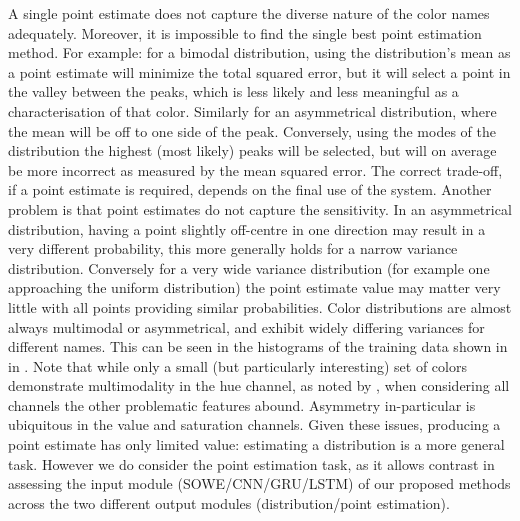 A single point estimate does not capture the diverse nature of the color names adequately. Moreover, it is impossible to find the single best point estimation method.
For example: for a bimodal distribution, using the distribution's mean as a point estimate will minimize the total squared error,  but it will select a point in the valley between the peaks, which is less likely and less meaningful as a characterisation of that color.
Similarly for an asymmetrical distribution, where the mean will be off to one side of the peak.
Conversely, using the modes of the distribution the highest (most likely) peaks will be selected, but will on average be more incorrect as measured by the mean squared error.
The correct trade-off, if a point estimate is required, depends on the final use of the system.
Another problem is that point estimates do not capture the sensitivity.
In an asymmetrical distribution, having a point slightly off-centre in one direction may result in a very different probability,
this more generally holds for a narrow variance distribution.
Conversely for a very wide variance distribution (for example one approaching the uniform distribution) the point estimate value may matter very little with all points providing similar probabilities.
Color distributions are almost always multimodal or asymmetrical, and exhibit widely differing variances for different names.
This can be seen in the histograms of the training data shown in  in .
Note that while only a small (but particularly interesting) set of colors demonstrate multimodality in the hue channel, as noted by \textcite{mcmahan2015bayesian}, when considering all channels the other problematic features  abound. Asymmetry in-particular is ubiquitous in the value and saturation channels.
Given these issues, producing a point estimate has only limited value: estimating a distribution is a  more general task.
However we do consider the point estimation task, as it allows contrast in assessing the input module (SOWE/CNN/GRU/LSTM) of our proposed methods across the two different output modules (distribution/point estimation).

